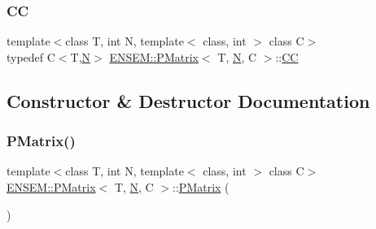 \mbox{\label{classENSEM_1_1PMatrix_a744bac549029029effe32dc1705660ec}} 
\subsubsection{\texorpdfstring{CC}{CC}\hspace{0.1cm}{\footnotesize\ttfamily [3/3]}}
{\footnotesize\ttfamily template$<$class T, int N, template$<$ class, int $>$ class C$>$ \\
typedef C$<$T,\mbox{\hyperlink{adat__devel_2lib_2hadron_2operator__name__util_8cc_a7722c8ecbb62d99aee7ce68b1752f337}{N}}$>$ \mbox{\hyperlink{classENSEM_1_1PMatrix}{E\+N\+S\+E\+M\+::\+P\+Matrix}}$<$ T, \mbox{\hyperlink{adat__devel_2lib_2hadron_2operator__name__util_8cc_a7722c8ecbb62d99aee7ce68b1752f337}{N}}, C $>$\+::\mbox{\hyperlink{classENSEM_1_1PMatrix_a744bac549029029effe32dc1705660ec}{CC}}}



\subsection{Constructor \& Destructor Documentation}
\mbox{\label{classENSEM_1_1PMatrix_ae32acebccb43c577a9e4dde0866a6c78}} 
\subsubsection{\texorpdfstring{PMatrix()}{PMatrix()}\hspace{0.1cm}{\footnotesize\ttfamily [1/3]}}
{\footnotesize\ttfamily template$<$class T, int N, template$<$ class, int $>$ class C$>$ \\
\mbox{\hyperlink{classENSEM_1_1PMatrix}{E\+N\+S\+E\+M\+::\+P\+Matrix}}$<$ T, \mbox{\hyperlink{adat__devel_2lib_2hadron_2operator__name__util_8cc_a7722c8ecbb62d99aee7ce68b1752f337}{N}}, C $>$\+::\mbox{\hyperlink{classENSEM_1_1PMatrix}{P\+Matrix}} (\begin{DoxyParamCaption}{ }\end{DoxyParamCaption})\hspace{0.3cm}{\ttfamily [inline]}}

